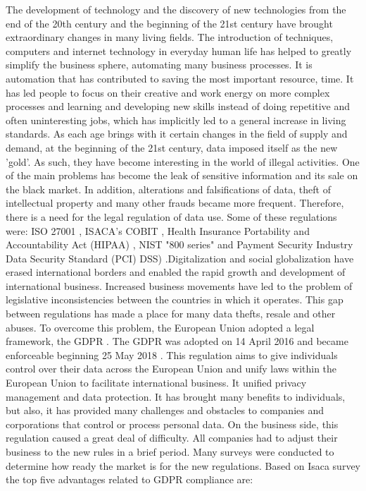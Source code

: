 \documentclass[11pt,english]{article}
\begin{document}
\quad The development of technology and the discovery of new technologies from the end of the 20th century and the beginning of the 21st century have brought extraordinary changes in many living fields. The introduction of techniques, computers and internet technology in everyday human life has helped to greatly simplify the business sphere, automating many business processes. It is automation that has contributed to saving the most important resource, time. It has led people to focus on their creative and work energy on more complex processes and learning and developing new skills instead of doing repetitive and often uninteresting jobs, which has implicitly led to a general increase in living standards. \newline As each age brings with it certain changes in the field of supply and demand, at the beginning of the 21st century, data imposed itself as the new 'gold'. As such, they have become interesting in the world of illegal activities. One of the main problems has become the leak of sensitive information and its sale on the black market. In addition, alterations and falsifications of data, theft of intellectual property and many other frauds became more frequent. Therefore, there is a need for the legal regulation of data use. Some of these regulations were: ISO 27001 \cite{iso}, ISACA's COBIT \cite{cobit}, Health Insurance Portability and Accountability Act (HIPAA) \cite{hipaa}, NIST "800 series" \cite{nist} and Payment Security Industry Data Security Standard (PCI) DSS) \cite{pci}.\newline Digitalization and social globalization have erased international borders and enabled the rapid growth and development of international business. Increased business movements have led to the problem of legislative inconsistencies between the countries in which it operates. This gap between regulations has made a place for many data thefts, resale and other abuses. To overcome this problem, the European Union adopted a legal framework, the GDPR \cite{gdprRegulation}. The GDPR was adopted on 14 April 2016 and became enforceable beginning 25 May 2018 \cite{gdpr}. This regulation aims to give individuals control over their data across the European Union and unify laws within the European Union to facilitate international business. It unified privacy management and data protection. It has brought many benefits to individuals, but also, it has provided many challenges and obstacles to companies and corporations that control or process personal data. On the business side, this regulation caused a great deal of difficulty. All companies had to adjust their business to the new rules in a brief period. \newline \quad Many surveys were conducted to determine how ready the market is for the new regulations. Based on Isaca survey \cite{isaca} the top five advantages related to GDPR compliance are:
\end{document}
